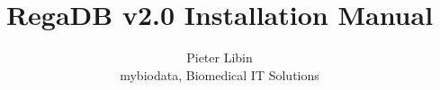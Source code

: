 \documentclass[12pt,makeidx]{phdthesis}
\begin{document}
\title{RegaDB v2.0 Installation Manual}
\author{Pieter Libin\\mybiodata, Biomedical IT Solutions}
\maketitle

\cleardoublepage
\lhead[]{\fancyplain{}{\rightmark}}
\chead[\fancyplain{}{}]{\fancyplain{}{}}
\rhead[\fancyplain{}{\leftmark}]{\fancyplain{}{}}

\setcounter{tocdepth}{2}
\tableofcontents

{}
%

\cleardoublepage

\newcommand{\publ}{}

\pagestyle{fancyplain}
\renewcommand{\sectionmark}[1]{\markright{\it \thesection.\ #1}}
\renewcommand{\chaptermark}[1]{\markboth{
       \it \thechapter.\ #1}{}}
\lhead[\thepage]{\fancyplain{\publ}{\rightmark}}
\chead[\fancyplain{}{}]{\fancyplain{}{}}
\rhead[\fancyplain{}{\leftmark}]{\fancyplain{}{\thepage}}
\lfoot[]{}
\cfoot[]{}
\rfoot[]{}







\end{document}
